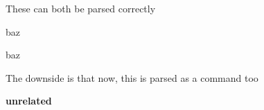 These can both be parsed correctly

{
  baz
}

  {
    baz
  }


The downside is that now, this is parsed as a command too

\noin
{\bf unrelated}
